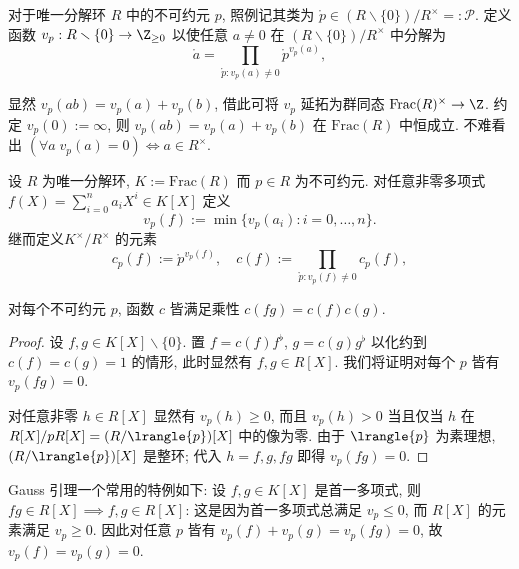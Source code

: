 对于唯一分解环 $R$ 中的不可约元 $p$, 照例记其类为 $\mathring{p} \in (R \smallsetminus \{0\})/R^\times =: \mathcal{P}$. 定义函数 $v_p: R \smallsetminus \{0\} \to \Z_{\geq 0}$ 以使任意 $a \neq 0$ 在 $(R \smallsetminus \{0\})/R^\times$ 中分解为
\[ \mathring{a} = \prod_{\mathring{p}: v_p(a) \neq 0} \mathring{p}^{v_p(a)}, \]

显然 $v_p(ab) = v_p(a) + v_p(b)$, 借此可将 $v_p$ 延拓为群同态 $\text{Frac}(R)^\times \to \Z$. 约定 $v_p(0) := \infty$, 则 $v_p(ab) = v_p(a)+v_p(b)$ 在 $\text{Frac}(R)$ 中恒成立. 不难看出 $(\forall a \; v_p(a) = 0) \iff a \in R^\times$.

\begin{definition} %
	设 $R$ 为唯一分解环, $K := \mathrm{Frac}(R)$ 而 $p \in R$ 为不可约元. 对任意非零多项式 $f(X) = \sum_{i=0}^n a_i X^i \in K[X]$ 定义
	\[ v_p(f) :=  \min\{ v_p(a_i) : i = 0, \ldots, n\}. \] 
	继而定义$K^\times/R^\times$ 的元素
	\[ c_p(f) := \mathring{p}^{v_p(f)}, \quad c(f) := \prod_{\mathring{p}: v_p(f) \neq 0} c_p(f), \] 
\end{definition}

\begin{lemma}[C.\ F.\ Gauss]\label{prop:Gauss-lemma}
	对每个不可约元 $p$, 函数 $c$ 皆满足乘性 $c(fg) = c(f)c(g)$.
\end{lemma}
\begin{proof}
	设 $f,g \in K[X] \smallsetminus \{0\}$. 置 $f = c(f) f^\flat$, $g = c(g) g^\flat$ 以化约到 $c(f) = c(g) = 1$ 的情形, 此时显然有 $f,g \in R[X]$. 我们将证明对每个 $p$ 皆有 $v_p(fg) = 0$.

	对任意非零 $h \in R[X]$ 显然有 $v_p(h) \geq 0$, 而且 $v_p(h) > 0$ 当且仅当 $h$ 在 $R[X]/pR[X] = (R/\lrangle{p})[X]$ 中的像为零. 由于 $\lrangle{p}$ 为素理想, $(R/\lrangle{p})[X]$ 是整环; 代入 $h=f,g,fg$ 即得 $v_p(fg)=0$.
\end{proof}

\begin{remark}\label{rem:Gauss-lemma-monic}
	Gauss 引理一个常用的特例如下: 设 $f,g \in K[X]$ 是首一多项式, 则 $fg \in R[X] \implies f,g \in R[X]$: 这是因为首一多项式总满足 $v_p \leq 0$, 而 $R[X]$ 的元素满足 $v_p \geq 0$. 因此对任意 $p$ 皆有 $v_p(f) + v_p(g) = v_p(fg) = 0$, 故 $v_p(f)=v_p(g)=0$.
\end{remark}


